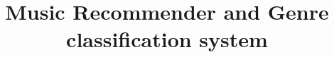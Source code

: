 \documentclass{sig-alternate-05-2015}
\begin{document}


\doi{}

\isbn{}


%
\conferenceinfo{}{}

\title{Music Recommender and Genre classification system}
\subtitle{}
%
%
%
%
%
\end{document}
